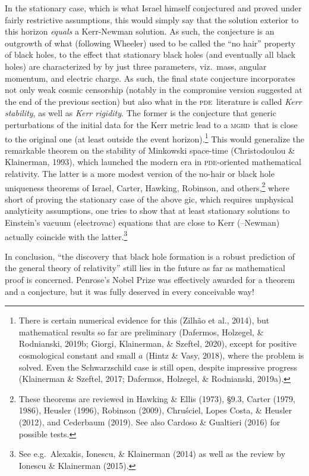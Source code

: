 \documentclass[11pt,a4paper]{article}
\newcommand{\mghd}{\textsc{mghd}}
\newcommand{\pde}{\textsc{pde}}
\begin{document}
 In the stationary case, which is what Israel himself conjectured and proved under fairly restrictive assumptions, this would simply say that the solution exterior to this horizon \emph{equals} a Kerr-Newman solution. As such, the conjecture  is an outgrowth of what (following Wheeler) used to be called the ``no hair'' property of black holes, to the effect that stationary black holes (and eventually all black holes)
  are characterized by by just three parameters, viz.\ mass, angular momentum, and electric charge. As such, the final state conjecture incorporates not only weak cosmic censorship (notably in the compromise version suggested at the end of the previous section) but also what in the \pde\ literature is called \emph{Kerr stability},  as well as \emph{Kerr rigidity}. The former is
   the conjecture that generic  perturbations of the  initial data
 for the  Kerr metric lead to a \mghd\ that is close to the original one (at least outside the event horizon).\footnote{There is certain  numerical evidence for this (Zilh\~{a}o et al., 2014), but mathematical results so far are  preliminary (Dafermos,  Holzegel, \&  Rodnianski, 2019b; 
Giorgi, Klainerman, \& Szeftel, 2020), except for positive cosmological constant and small $a$  (Hintz \& Vasy, 2018), where the problem is solved. 
Even the Schwarzschild case is still open, despite impressive progress (Klainerman \& Szeftel, 2017; Dafermos,  Holzegel, \&  Rodnianski, 2019a).
} This would generalize the remarkable theorem on the stability of Minkowski space-time (Christodoulou \& Klainerman, 1993), which launched the modern era in \pde-oriented mathematical relativity. 
The latter  is a more modest version of the no-hair or black hole uniqueness theorems of Israel, Carter, Hawking, Robinson, and others,\footnote{These theorems are reviewed in Hawking \& Ellis (1973), \S 9.3, Carter (1979, 1986), Heusler (1996), Robinson (2009), Chru\'{s}ciel,  Lopes Costa, \& Heusler (2012), and Cederbaum (2019).  See also Cardoso \&  Gualtieri (2016) for possible  tests.
} where short of proving the stationary case of the above {\sc gic}, which requires unphysical analyticity assumptions, one tries to show that at least stationary solutions to Einstein's vacuum (electrovac) equations that are close to Kerr (--Newman) actually coincide with the latter.\footnote{See e.g.\
Alexakis,  Ionescu, \& Klainerman (2014) as well as the review by Ionescu \&  Klainerman (2015).}
\smallskip

In conclusion, ``the discovery that black hole formation is a robust prediction of the general theory of relativity'' still lies in the future as far as mathematical proof is concerned. Penrose's Nobel Prize was effectively awarded for a theorem and a conjecture, but it was fully deserved in every conceivable way!
\appendix
\end{document}
